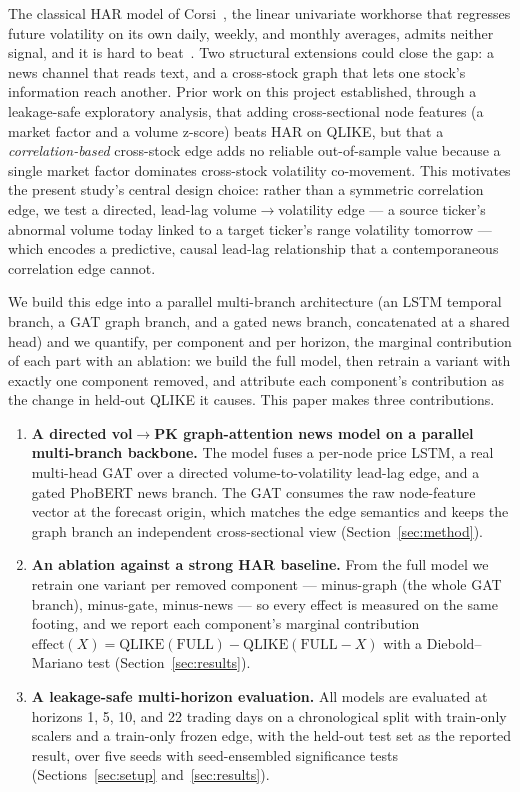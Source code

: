 \documentclass[runningheads]{llncs}
\begin{document}
The classical HAR model of Corsi~\cite{corsi2009}, the linear univariate workhorse that regresses future
volatility on its own daily, weekly, and monthly averages, admits neither signal, and it is hard to
beat~\cite{audrino2025}. Two structural extensions could close the gap: a news channel that reads text, and
a cross-stock graph that lets one stock's information reach another. Prior work on this project
established, through a leakage-safe exploratory analysis, that adding cross-sectional node features (a
market factor and a volume z-score) beats HAR on QLIKE, but that a \emph{correlation-based} cross-stock
edge adds no reliable out-of-sample value because a single market factor dominates cross-stock volatility
co-movement. This motivates the present study's central design choice: rather than a symmetric correlation
edge, we test a directed, lead-lag volume$\to$volatility edge --- a source ticker's abnormal volume today
linked to a target ticker's range volatility tomorrow --- which encodes a predictive, causal lead-lag
relationship that a contemporaneous correlation edge cannot.

We build this edge into a parallel multi-branch architecture (an LSTM temporal branch, a GAT graph branch,
and a gated news branch, concatenated at a shared head) and we quantify, per component and per horizon, the
marginal contribution of each part with an ablation: we build the full model, then retrain a variant with
exactly one component removed, and attribute each component's contribution as the change in held-out QLIKE
it causes. This paper makes three contributions.
\begin{enumerate}
\item \textbf{A directed vol$\to$PK graph-attention news model on a parallel multi-branch backbone.} The
model fuses a per-node price LSTM, a real multi-head GAT over a directed volume-to-volatility lead-lag edge,
and a gated PhoBERT news branch. The GAT consumes the raw node-feature vector at the forecast origin, which
matches the edge semantics and keeps the graph branch an independent cross-sectional view
(Section~\ref{sec:method}).
\item \textbf{An ablation against a strong HAR baseline.} From the full model we retrain one variant per
removed component --- minus-graph (the whole GAT branch), minus-gate, minus-news --- so every effect is
measured on the same footing, and we report each component's marginal contribution
$\text{effect}(X)=\text{QLIKE}(\text{FULL})-\text{QLIKE}(\text{FULL}{-}X)$ with a Diebold--Mariano test
(Section~\ref{sec:results}).
\item \textbf{A leakage-safe multi-horizon evaluation.} All models are evaluated at horizons 1, 5, 10, and
22 trading days on a chronological split with train-only scalers and a train-only frozen edge, with the
held-out test set as the reported result, over five seeds with seed-ensembled significance tests
(Sections~\ref{sec:setup} and~\ref{sec:results}).
\end{enumerate}
\end{document}
